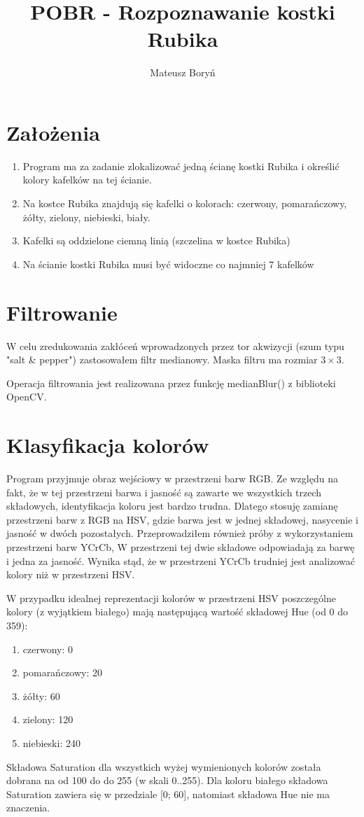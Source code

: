 \documentclass[12pt,a4paper]{article}
\author{Mateusz Boryń}
\title{POBR - Rozpoznawanie kostki Rubika}
\begin{document}
\maketitle

\section{Założenia}

\begin{enumerate}
\item Program ma za zadanie zlokalizować jedną ścianę kostki Rubika i określić kolory kafelków na tej ścianie.
\item Na kostce Rubika znajdują się kafelki o kolorach: czerwony, pomarańczowy, żółty, zielony, niebieski, biały.
\item Kafelki są oddzielone ciemną linią (szczelina w kostce Rubika)
\item Na ścianie kostki Rubika musi być widoczne co najmniej 7 kafelków
\end{enumerate}


\section{Filtrowanie}

W celu zredukowania zakłóceń wprowadzonych przez tor akwizycji (szum typu "salt \& pepper") zastosowałem filtr medianowy. Maska filtru ma rozmiar $ 3 \times 3 $.

Operacja filtrowania jest realizowana przez funkcję medianBlur() z biblioteki OpenCV.

\section{Klasyfikacja kolorów}

Program przyjmuje obraz wejściowy w przestrzeni barw RGB. Ze względu na fakt, że w tej przestrzeni barwa i jasność są zawarte we wszystkich trzech składowych, identyfikacja koloru jest bardzo trudna. Dlatego stosuję zamianę przestrzeni barw z RGB na HSV, gdzie barwa jest w jednej składowej, nasycenie i jasność w dwóch pozostałych. Przeprowadziłem również próby z wykorzystaniem przestrzeni barw YCrCb, W przestrzeni tej dwie składowe odpowiadają za barwę i jedna za jasność. Wynika stąd, że w przestrzeni YCrCb trudniej jest analizować kolory niż w przestrzeni HSV.

W przypadku idealnej reprezentacji kolorów w przestrzeni HSV poszczególne kolory (z wyjątkiem białego) mają następującą wartość składowej Hue (od 0 do 359):
\begin{enumerate}
\item czerwony: 0
\item pomarańczowy: 20
\item żółty: 60
\item zielony: 120
\item niebieski: 240
\end{enumerate}
Składowa Saturation dla wszystkich wyżej wymienionych kolorów została dobrana na od 100 do do 255 (w skali 0..255).
Dla koloru białego składowa Saturation zawiera się w przedziale [0; 60], natomiast składowa Hue nie ma znaczenia.
\end{document}
